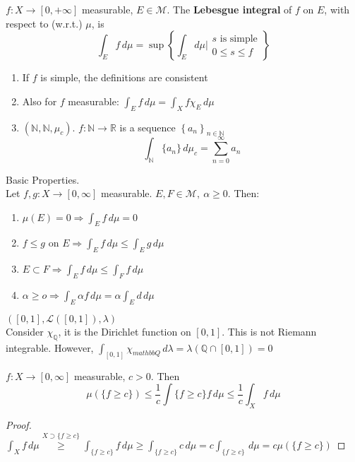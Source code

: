 \begin{definition}
    \(f:X \to [0, +\infty]\) measurable, \(E \in \mathcal{M}\). The \textbf{Lebesgue integral} of \(f\) on \(E\), with respect to (w.r.t.) \(\mu\), is 
    \[
        \int_E f \, d\mu = \sup \left\{ \int_E d\mu \vert \begin{array}{l}s\text{ is simple} \\ 0 \leq s \leq f \end{array}\right\}
    \]
\end{definition}

\begin{enumerate}
    \item If \(f \) is simple, the definitions are consistent
    \item Also for \(f\) measurable: \( \int_E f \, d\mu = \int_X f \chi_E \, d\mu\)
    \item \( \left( \mathbb{N}, \mathcal{\mathbb{N}}, \mu_c \right)\). \(f: \mathbb{N} \to \mathbb{R}\) is a sequence \( \left\{ a_n \right\}_{n \in \mathbb{N}}\) \[ \int_\mathbb{N} \{a_n\} \, d\mu_c = \sum_{n=0}^\infty a_n\]
\end{enumerate}

Basic Properties. \\
Let \(f, g : X \to \left[0, \infty\right]\) measurable. \(E, F \in \mathcal{M}, \ \alpha \geq 0\). Then: 
\begin{enumerate}
    \item \(\mu(E)=0 \Rightarrow \int_E f \, d\mu = 0\)
    \item \(f \leq g \) on \(E \Rightarrow \int_E f \, d\mu \leq \int_E g \, d\mu \)
    \item \(E \subset F \Rightarrow \int_E f \, d\mu \leq \int_F f \, d\mu\)
    \item \(\alpha \geq o \Rightarrow \int_E \alpha f \, d\mu = \alpha \int_E d \, d\mu\)
\end{enumerate}

\begin{remark}
    \(\left(\left[0, 1\right], \mathcal{L}(\left[0, 1\right]), \lambda  \right)\) \\
    Consider \(\chi_\mathbb{Q}\), it is the Dirichlet function on \(\left[0, 1\right]\). This is not Riemann integrable. However, \(\int_{\left[0,1\right]} \chi_{mathbb{Q}} \, d\lambda = \lambda \left( \mathbb{Q} \cap \left[0,1\right] \right) =0 \)
\end{remark}

\begin{theorem}
    \(f: X \to \left[0, \infty \right]\) measurable, \(c > 0\). Then \[ \mu\left(\{f \geq c \}\right) \leq \frac{1}{c} \int{\{f \geq c \}} f \, d\mu \leq \frac{1}{c} \int_X f \, d\mu \]
\end{theorem}
\begin{proof}
    \( \int_X f \, d\mu \overset{X \supset \{f \geq c\}}{\geq} \int_{\{f \geq c \}} f \, d\mu \geq \int_{\{f \geq c\}} c \, d\mu 
    = c \int_{\{f \geq c\}} \, d\mu 
    = c \mu \left(\{f \geq c\}\right) \)
\end{proof}

